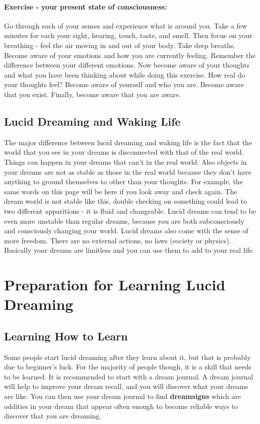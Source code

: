\documentclass{article}
\begin{document}
\paragraph{Exercise - your present state of consciousness:} Go through each of your senses and experience what is around you. Take a few minutes for each your sight, hearing, touch, taste, and smell. Then focus on your breathing - feel the air moving in and out of your body. Take deep breaths. Become aware of your emotions and how you are currently feeling. Remember the difference between your different emotions. Now become aware of your thoughts and what you have been thinking about while doing this exercise. How real do your thoughts feel? Become aware of yourself and who you are. Become aware that you exist. Finally, become aware that you are aware.

\subsection{Lucid Dreaming and Waking Life}
The major difference between lucid dreaming and waking life is the fact that the world that you see in your dreams is disconnected with that of the real world. Things can happen in your dreams that can't in the real world. Also objects in your dreams are not as stable as those in the real world because they don't have anything to ground themselves to other than your thoughts. For example, the same words on this page will be here if you look away and check again. The dream world is not stable like this, double checking on something could lead to two different apparitions - it is fluid and changeable. Lucid dreams can tend to be even more unstable than regular dreams, because you are both subconsciously and consciously changing your world. Lucid dreams also come with the sense of more freedom. There are no external actions, no laws (society or physics). Basically your dreams are limitless and you can use them to add to your real life.

\section{Preparation for Learning Lucid Dreaming}
\subsection{Learning How to Learn}
Some people start lucid dreaming after they learn about it, but that is probably due to beginner's luck. For the majority of people though, it is a skill that needs to be learned. It is recommended to start with a dream journal. A dream journal will help to improve your dream recall, and you will discover what your dreams are like. You can then use your dream journal to find \textbf{dreamsigns} which are oddities in your dream that appear often enough to become reliable ways to discover that you are dreaming.
\end{document}
